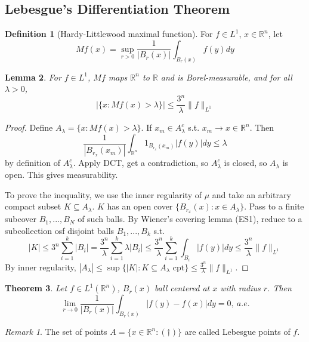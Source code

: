 \documentclass{article}
\theoremstyle{definition}
\newtheorem{defn}{Definition}[section]
\theoremstyle{remark}
\newtheorem{rem}{Remark}
\theoremstyle{plain}
\newtheorem{lem}[defn]{Lemma}
\newtheorem{thm}[defn]{Theorem}
\newcommand{\RR}{\mathbb{R}}
\begin{document}
\subsection{Lebesgue's Differentiation Theorem}
\begin{defn}[Hardy-Littlewood maximal function]
    For $f\in L^1$, $x\in\RR^n$, let $$Mf(x)=\sup_{r>0}\dfrac{1}{|B_r(x)|}\int_{B_r(x)}f(y)dy$$
\end{defn}
\begin{lem}
    For $f\in L^1$, $Mf$ maps $\RR^n$ to $\RR$ and is Borel-measurable, and for all $\lambda>0$,
    \[|\{x:Mf(x)>\lambda\}|\le\dfrac{3^n}{\lambda}\|f\|_{L^1}\]
\end{lem}
\begin{proof}
    Define $A_\lambda=\{x:Mf(x)>\lambda\}$. %
    If $x_m\in A_\lambda^c$ s.t. $x_m\to x\in\RR^n$. Then
    \[\dfrac{1}{|B_{r_x}(x_m)|}\int_{\RR^n}1_{B_{r_x}(x_m)}|f(y)|dy\le\lambda\]
    by definition of $A_\lambda^c$. Apply DCT, get a contradiction, so $A^c_\lambda$ is closed, so $A_\lambda$ is open. This gives measurability.

    To prove the inequality, we use the inner regularity of \(\mu\) and take an arbitrary compact subset $K\subseteq A_\lambda$. $K$ has an open cover $\{B_{r_x}(x):x\in A_\lambda\}$. Pass to a finite subcover $B_1,...,B_N$ of such balls. By Wiener's covering lemma (ES1), reduce to a subcollection osf disjoint balls $B_1,...,B_k$ s.t. $$|K|\le 3^n\sum_{i=1}^k|B_i|=\dfrac{3^n}{\lambda}\sum_{i=1}^k\lambda|B_i|\le \dfrac{3^n}{\lambda}\sum_{i=1}^k\int_{B_i}|f(y)|dy\le \dfrac{3^n}{\lambda}\|f\|_{L^1}$$
    By inner regularity, $|A_\lambda|\le\sup\{|K|:K\subseteq A_\lambda\text{ cpt}\}\le\frac{3^n}{\lambda}\|f\|_{L^1}$.
\end{proof}
\begin{thm}
    Let $f\in L^1(\RR^n)$, $B_r(x)$ ball centered at $x$ with radius $r$. Then
    \[\lim_{r\to 0}\dfrac{1}{|B_r(x)|}\int_{B_r(x)}|f(y)-f(x)|dy=0,\ a.e.\tag{$\dagger$}\]
\end{thm}
\begin{rem}
    The set of points $A=\{x\in\RR^n:(\dagger)\}$ are called Lebesgue points of $f$.
\end{rem}
\end{document}
